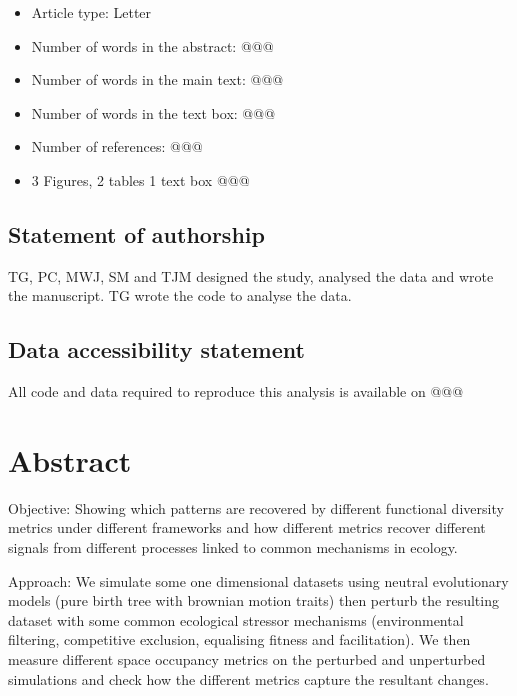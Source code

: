 \documentclass[12pt,letterpaper]{article}
\begin{document}
\begin{itemize}
   \item Article type: Letter
   \item Number of words in the abstract: @@@
   \item Number of words in the main text: @@@
   \item Number of words in the text box: @@@
   \item Number of references: @@@
   \item 3 Figures, 2 tables 1 text box @@@
\end{itemize}

\subsection{Statement of authorship}

TG, PC, MWJ, SM and TJM designed the study, analysed the data and wrote the manuscript. TG wrote the code to analyse the data.

\subsection{Data accessibility statement}

All code and data required to reproduce this analysis is available on @@@

%
%

\newpage
\modulolinenumbers[1]
\linenumbers

\section{Abstract}
Objective: Showing which patterns are recovered by different functional diversity metrics under different frameworks and how different metrics recover different signals from different processes linked to common mechanisms in ecology.

Approach: We simulate some one dimensional datasets using neutral evolutionary models (pure birth tree with brownian motion traits) then perturb the resulting dataset with some common ecological stressor mechanisms (environmental filtering, competitive exclusion, equalising fitness and facilitation).
We then measure different space occupancy metrics on the perturbed and unperturbed simulations and check how the different metrics capture the resultant changes.
\end{document}
